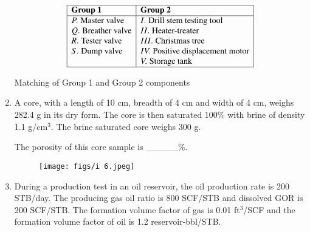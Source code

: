 \documentclass[journal]{IEEEtran}
\begin{document}
\begin{enumerate}
    \begin{table}[h!]
\centering
\[
\begin{array}{|l|l|}
\hline
\textbf{Group 1} & \textbf{Group 2} \\
\hline
P. \; \text{Master valve}   & I. \; \text{Drill stem testing tool} \\
Q. \; \text{Breather valve} & II. \; \text{Heater-treater} \\
R. \; \text{Tester valve}   & III. \; \text{Christmas tree} \\
S. \; \text{Dump valve}     & IV. \; \text{Positive displacement motor} \\
                            & V. \; \text{Storage tank} \\
\hline
\end{array}
\]
\caption{Matching of Group 1 and Group 2 components}
\label{tab:valves}
\end{table}

    
    \begin{enumerate}  \end{enumerate}              
    
    \hfill{}
    
    \item A core, with a length of 10 cm, breadth of 4 cm and width of 4 cm, weighs 282.4 g in its dry form. The core is then saturated 100\% with brine of density 1.1 g/cm$^3$. The brine saturated core weighs 300 g.
    
    The porosity of this core sample is \_\_\_\_\_\%.
\begin{figure}
    \centering
    \texttt{[image: figs/i 6.jpeg]}
    \caption{}
    \label{fig:placeholder}
\end{figure}
    \hfill{}
    
    \item During a production test in an oil reservoir, the oil production rate is 200 STB/day. The producing gas oil ratio  is 800 SCF/STB and dissolved GOR is 200 SCF/STB. The formation volume factor of gas is 0.01 ft$^3$/SCF and the formation volume factor of oil is 1.2 reservoir-bbl/STB.
    

\end{enumerate}
\end{document}
